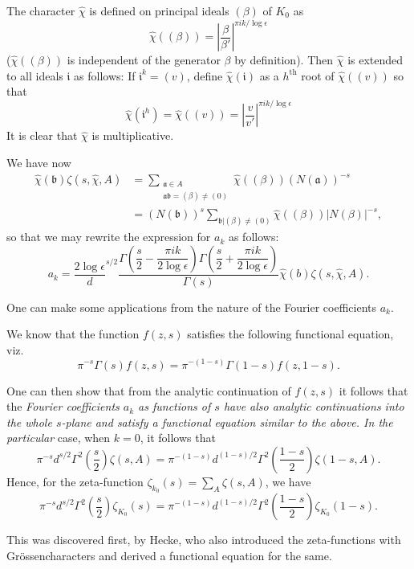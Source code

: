 The character $\hat{\chi}$ is defined on principal ideals
$(\beta)$ of $K_{0}$ as
$$
\hat{\chi}((\beta))=\left|\frac{\beta}{\beta'}\right|^{\pi
  ik/\log\epsilon}
$$
($\hat{\chi}((\beta))$ is independent of the generator $\beta$ by
definition). Then $\hat{\chi}$ is extended to all ideals
$\mathfrak{i}$ as follows: If $\mathfrak{i}^{k}=(v)$, define
$\hat{\chi}(\mathfrak{i})$ as a $h^{\text{th}}$ root of
$\hat{\chi}((v))$ so that 
$$
\hat{\chi}(\mathfrak{i}^{h})=\hat{\chi}((v))=\left|\frac{v}{v'}\right|^{\pi
  ik/\log\epsilon}
$$\pageoriginale
It is clear that $\hat{\chi}$ is multiplicative.

We have now
\begin{align*}
\hat{\chi}(\mathfrak{b})\zeta(s,\hat{\chi},A) &=
\sum_{\substack{\mathfrak{a}\in A\\ \mathfrak{ab}=(\beta)\neq
    (0)}}\hat{\chi}((\beta))(N(\mathfrak{a}))^{-s}\\
&=
(N(\mathfrak{b}))^{s}\sum_{\mathfrak{b}|(\beta)\neq(0)}\hat{\chi}((\beta))|N(\beta)|^{-s}, 
\end{align*}
so that we may rewrite the expression for $a_{k}$ as follows:
$$
a_{k}=\frac{2\log
  \epsilon}d^{s/2}\frac{\Gamma\left(\dfrac{s}{2}-\dfrac{\pi ik}{2\log
    \epsilon}\right)\Gamma\left(\dfrac{s}{2}+\dfrac{\pi ik}{2\log
    \epsilon}\right)}{\Gamma(s)}\hat{\chi}(b)\zeta(s,\hat{\chi},A).
$$

One can make some applications from the nature of the Fourier
coefficients $a_{k}$.

We know that the function $f(z,s)$ satisfies the following functional
equation, viz.
$$
\pi^{-s}\Gamma(s)f(z,s)=\pi^{-(1-s)}\Gamma(1-s)f(z,1-s).
$$

One can then show that from the analytic continuation of $f(z,s)$ it
follows that the {\em Fourier coefficients $a_{k}$ as functions of $s$
  have also analytic continuations into the whole $s$-plane and
  satisfy a functional equation similar to the above. In the
  particular} case, when $k=0$, it follows that
$$
\pi^{-s}d^{s/2}\Gamma^{2}\left(\frac{s}{2}\right)\zeta(s,A)=\pi^{-(1-s)}d^{(1-s)/2}\Gamma^{2}\left(\frac{1-s}{2}\right)\zeta(1-s,A).
$$
Hence, for the zeta-function
$\zeta_{k_{0}}(s)=\sum\limits_{A}\zeta(s,A)$, we have
$$
\pi^{-s}d^{s/2}\Gamma^{2}\left(\frac{s}{2}\right)\zeta_{K_{0}}(s)=\pi^{-(1-s)}d^{(1-s)/2}\Gamma^{2}\left(\frac{1-s}{2}\right)\zeta_{K_{0}}(1-s).
$$

This was discovered first, by Hecke, who also introduced the
zeta-functions with Gr\"ossencharacters and derived a functional
equation for the same.

